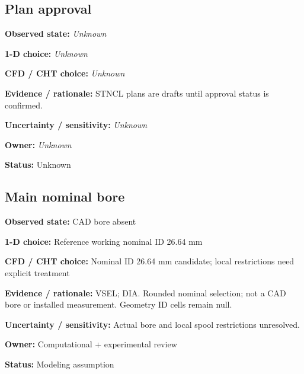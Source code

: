\documentclass[11pt]{article}
\begin{document}
\par\noindent\begin{minipage}{\textwidth}\small\setlength{\parskip}{2pt}
\subsection*{Plan approval}
\textbf{Observed state:} \textit{Unknown}\par
\textbf{1-D choice:} \textit{Unknown}\par
\textbf{CFD / CHT choice:} \textit{Unknown}\par
\textbf{Evidence / rationale:} STNCL plans are drafts until approval status is confirmed.\par
\textbf{Uncertainty / sensitivity:} \textit{Unknown}\par
\textbf{Owner:} \textit{Unknown}\par
\textbf{Status:} Unknown\par
\end{minipage}\par\vspace{5pt}
\par\noindent\begin{minipage}{\textwidth}\small\setlength{\parskip}{2pt}
\subsection*{Main nominal bore}
\textbf{Observed state:} CAD bore absent\par
\textbf{1-D choice:} Reference working nominal ID 26.64 mm\par
\textbf{CFD / CHT choice:} Nominal ID 26.64 mm candidate; local restrictions need explicit treatment\par
\textbf{Evidence / rationale:} VSEL; DIA. Rounded nominal selection; not a CAD bore or installed measurement. Geometry ID cells remain null.\par
\textbf{Uncertainty / sensitivity:} Actual bore and local spool restrictions unresolved.\par
\textbf{Owner:} Computational + experimental review\par
\textbf{Status:} Modeling assumption\par
\end{minipage}\par\vspace{5pt}
\end{document}
